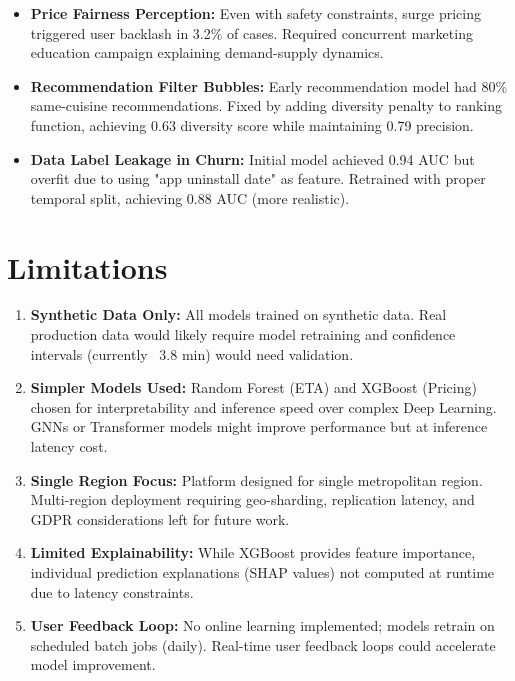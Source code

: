 \documentclass[12pt,a4paper]{report}
\begin{document}
\begin{itemize}
\begin{itemize}
    \item \textbf{Price Fairness Perception:} Even with safety constraints, surge pricing triggered user backlash in 3.2\% of cases. Required concurrent marketing education campaign explaining demand-supply dynamics.
    
    \item \textbf{Recommendation Filter Bubbles:} Early recommendation model had 80\% same-cuisine recommendations. Fixed by adding diversity penalty to ranking function, achieving 0.63 diversity score while maintaining 0.79 precision.
    
    \item \textbf{Data Label Leakage in Churn:} Initial model achieved 0.94 AUC but overfit due to using "app uninstall date" as feature. Retrained with proper temporal split, achieving 0.88 AUC (more realistic).
\end{itemize}

\section{Limitations}

\begin{enumerate}
    \item \textbf{Synthetic Data Only:} All models trained on synthetic data. Real production data would likely require model retraining and confidence intervals (currently ~3.8 min) would need validation.
    
    \item \textbf{Simpler Models Used:} Random Forest (ETA) and XGBoost (Pricing) chosen for interpretability and inference speed over complex Deep Learning. GNNs or Transformer models might improve performance but at inference latency cost.
    
    \item \textbf{Single Region Focus:} Platform designed for single metropolitan region. Multi-region deployment requiring geo-sharding, replication latency, and GDPR considerations left for future work.
    
    \item \textbf{Limited Explainability:} While XGBoost provides feature importance, individual prediction explanations (SHAP values) not computed at runtime due to latency constraints.
    
    \item \textbf{User Feedback Loop:} No online learning implemented; models retrain on scheduled batch jobs (daily). Real-time user feedback loops could accelerate model improvement.
\end{enumerate}


\end{itemize}
\end{document}
